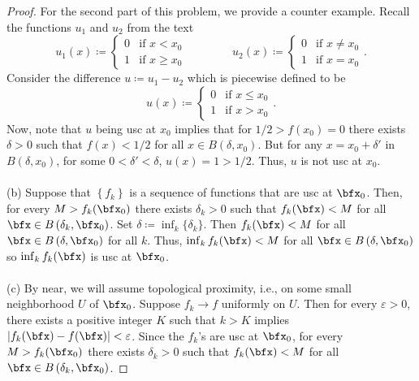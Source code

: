 \begin{proof}
For the second part of this problem, we provide a counter example. Recall
the functions $u_1$ and $u_2$ from the text
\begin{equation}
\label{eq:u-1-u-2-usc}
u_1(x)\coloneqq
\begin{cases}
0&\text{if $x<x_0$}\\
1&\text{if $x\geq x_0$}
\end{cases}
\qquad\qquad
u_2(x)\coloneqq
\begin{cases}
0&\text{if $x\neq x_0$}\\
1&\text{if $x=x_0$}
\end{cases}.
\end{equation}
Consider the difference $u\coloneqq u_1-u_2$ which is piecewise defined to
be
\begin{equation}
  \label{eq:u-piecewise}
u(x)\coloneqq\begin{cases}
0&\text{if $x\leq x_0$}\\
1&\text{if $x>x_0$}
\end{cases}.
\end{equation}
Now, note that $u$ being usc at $x_0$ implies that for $1/2>f(x_0)=0$ there
exists $\delta>0$ such that $f(x)<1/2$ for all $x\in B(\delta,x_0)$. But
for any $x=x_0+\delta'$ in $B(\delta,x_0)$, for some $0<\delta'<\delta$,
$u(x)=1>1/2$. Thus, $u$ is not usc at $x_0$.
\\\\
(b) Suppose that $\left\{f_k\right\}$ is a sequence of functions that are
usc at $\bfx_0$. Then, for every $M>f_k(\bfx_0)$ there exists $\delta_k>0$
such that $f_k(\bfx)<M$ for all $\bfx\in B\left(\delta_k,\bfx_0\right)$. Set
$\delta\coloneqq \inf_k\{\delta_k\}$. Then $f_k(\bfx)<M$ for all $\bfx\in
B\left(\delta,\bfx_0\right)$ for all $k$. Thus, $\inf_k f_k(\bfx)<M$ for
all $\bfx\in B\left(\delta,\bfx_0\right)$ so $\inf_k f_k(\bfx)$ is usc at
$\bfx_0$.
\\\\
(c) By near, we will assume topological proximity, i.e., on some small
neighborhood $U$ of $\bfx_0$. Suppose $f_k\to f$ uniformly on $U$. Then for
every $\varepsilon>0$, there exists a positive integer $K$ such that $k>K$
implies $\left|f_k(\bfx)-f(\bfx)\right|<\varepsilon$. Since the $f_k$'s are
usc at $\bfx_0$, for every $M>f_k(\bfx_0)$ there exists $\delta_k>0$ such
that $f_k(\bfx)<M$ for all $\bfx\in B\left(\delta_k,\bfx_0\right)$.
\end{proof}

